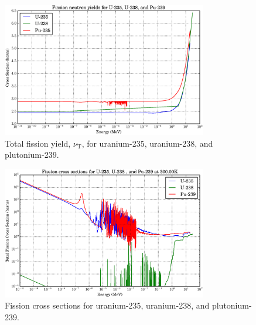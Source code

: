 \begin{figure}[h!]
  \centering
    \includegraphics[width=0.8\textwidth]{graphics/nu_compare.eps}
     \caption{Total fission yield, $\nu_\mathrm{T}$, for uranium-235, uranium-238, and plutonium-239. \label{nu_compare}}
\end{figure}

\begin{figure}[h!]
  \centering
    \includegraphics[width=0.8\textwidth]{graphics/xs_fissile.eps}
     \caption{Fission cross sections for uranium-235, uranium-238, and plutonium-239. \label{xs_fission_only}}
\end{figure}


